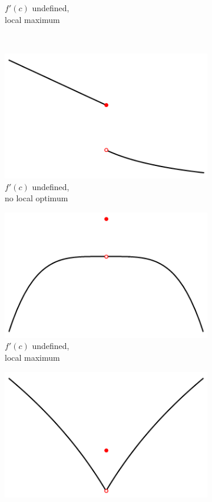 \documentclass[11pt]{article}
\theoremstyle{definition} %
\begin{document}
\begin{figure}[h]
\begin{subfigure}{0.3\textwidth}
		\caption{$f'(c)$ undefined,\\local maximum}
	\end{subfigure}
	\\
	\begin{subfigure}{0.3\textwidth}
		\centering
		\includegraphics[width=\textwidth]{figures/cp07.png}
		\caption{$f'(c)$ undefined,\\no local optimum}
	\end{subfigure}
	\hfill
	\begin{subfigure}{0.3\textwidth}
		\centering
		\includegraphics[width=\textwidth]{figures/cp08.png}
		\caption{$f'(c)$ undefined,\\local maximum}
	\end{subfigure}
	\hfill
	\begin{subfigure}{0.3\textwidth}
		\centering
		\includegraphics[width=\textwidth]{figures/cp09.png}

\end{subfigure}
\end{figure}
\end{document}
